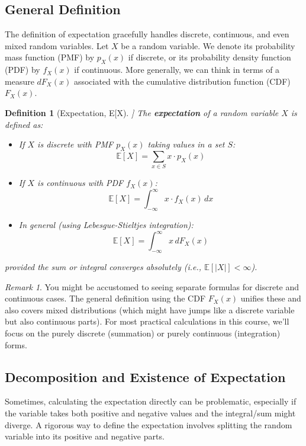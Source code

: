 \documentclass[11pt]{article}
\newtheorem{definition}[theorem]{Definition}
\theoremstyle{definition}
\theoremstyle{remark}
\newtheorem{remark}[theorem]{Remark}
\newcommand{\E}{\mathbb{E}}
\begin{document}
\subsection{General Definition}

The definition of expectation gracefully handles discrete, continuous, and even mixed random variables. Let $X$ be a random variable. We denote its probability mass function (PMF) by $p_X(x)$ if discrete, or its probability density function (PDF) by $f_X(x)$ if continuous. More generally, we can think in terms of a measure $dF_X(x)$ associated with the cumulative distribution function (CDF) $F_X(x)$.

\begin{definition}[Expectation, E[X]]
The \textbf{expectation} of a random variable $X$ is defined as:
\begin{itemize}
    \item If $X$ is discrete with PMF $p_X(x)$ taking values in a set $S$:
      \[ \E[X] = \sum_{x \in S} x \cdot p_X(x) \]
    \item If $X$ is continuous with PDF $f_X(x)$:
      \[ \E[X] = \int_{-\infty}^{\infty} x \cdot f_X(x) \, dx \]
    \item In general (using Lebesgue-Stieltjes integration):
      \[ \E[X] = \int_{-\infty}^{\infty} x \, dF_X(x) \]
\end{itemize}
provided the sum or integral converges absolutely (i.e., $\E[|X|] < \infty$).
\end{definition}

\begin{remark}
You might be accustomed to seeing separate formulas for discrete and continuous cases. The general definition using the CDF $F_X(x)$ unifies these and also covers mixed distributions (which might have jumps like a discrete variable but also continuous parts). For most practical calculations in this course, we'll focus on the purely discrete (summation) or purely continuous (integration) forms.
\end{remark}

\subsection{Decomposition and Existence of Expectation}

Sometimes, calculating the expectation directly can be problematic, especially if the variable takes both positive and negative values and the integral/sum might diverge. A rigorous way to define the expectation involves splitting the random variable into its positive and negative parts.
\end{document}
